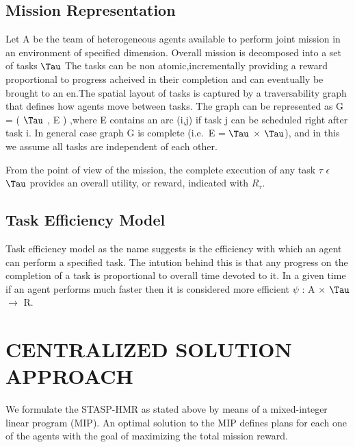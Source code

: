 \documentclass[conference]{IEEEtran}
\begin{document}
\subsection{Mission Representation}
Let A be the team of heterogeneous agents available to perform joint mission in an environment of specified dimension. Overall mission is decomposed into a set of tasks \( \Tau \) The tasks can be non atomic,incrementally providing a reward proportional to progress acheived in their completion and can eventually be brought to an en.The spatial layout of tasks is captured by a traversability graph that defines how agents move between tasks\cite{feo2016decentralized}.
The graph can be represented as G = ( \( \Tau \) , E ) ,where E contains an arc (i,j) if task j can be scheduled right after task i. In general case graph G is complete (i.e.\, E = \( \Tau \) \( \times \) \( \Tau \)), and in this we assume all tasks are independent of each other.

From the point of view of the mission, the complete execution of any task \( \tau \) \( \epsilon \) \( \Tau \) provides an overall utility, or reward, indicated with \( R_{\tau} \).

\subsection{Task Efficiency Model}
Task efficiency model as the name suggests is the efficiency with which an agent can perform a specified task. The intution behind this is that any progress on the completion of a task is proportional to overall time devoted to it. In a given time if an agent performs much faster then it is considered more efficient \( \psi \) : A \( \times \) \( \Tau \) \( \to \) {R}\cite{feo2016decentralized}. 

\section{CENTRALIZED SOLUTION APPROACH}
We formulate the STASP-HMR as stated above by means of a mixed-integer linear program (MIP). An optimal solution to the MIP defines plans for each one of the agents with the goal of maximizing the total mission reward.
\end{document}
